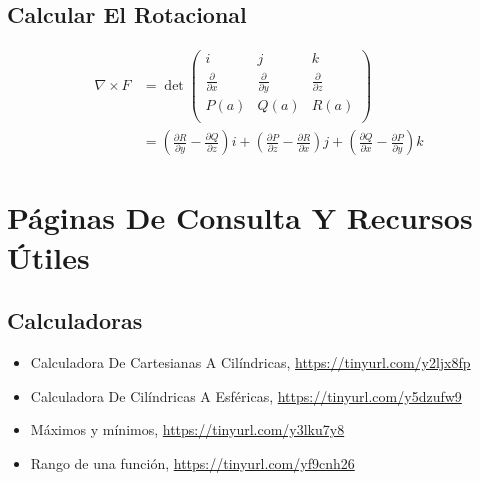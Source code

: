 \documentclass{article}
\begin{document}
\subsection{Calcular El Rotacional}
\label{sec:org9f8c82d}

\[ \begin{aligned} \nabla \times F &= \det\begin{pmatrix}
       i    &      j    &     k    \\
  \frac{\partial }{\partial x} & \frac{\partial }{\partial y} & \frac{\partial }{\partial z} \\
  P(a) & Q(a) & R(a) \\
\end{pmatrix} \\ &= 
\left( \frac{\partial R}{\partial y} - \frac{\partial Q}{\partial z} \right)i + 
\left( \frac{\partial P}{\partial z} - \frac{\partial R}{\partial x} \right)j + 
\left( \frac{\partial Q}{\partial x} - \frac{\partial P}{\partial y} \right)k
\end{aligned}\]



\section{Páginas De Consulta Y Recursos Útiles}
\label{sec:org4fd7630}
\subsection{Calculadoras}
\label{sec:org2e15bb6}
\begin{itemize}
\item Calculadora De Cartesianas A Cilíndricas, \url{https://tinyurl.com/y2ljx8fp}
\item Calculadora De Cilíndricas A Esféricas, \url{https://tinyurl.com/y5dzufw9}
\item Máximos y mínimos, \url{https://tinyurl.com/y3lku7y8}
\item Rango de una función, \url{https://tinyurl.com/yf9cnh26}
\end{itemize}
\end{document}
